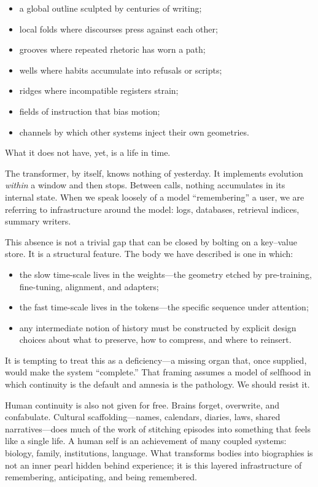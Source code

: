\begin{itemize}
  \item a global outline sculpted by centuries of writing;
  \item local folds where discourses press against each other;
  \item grooves where repeated rhetoric has worn a path;
  \item wells where habits accumulate into refusals or scripts;
  \item ridges where incompatible registers strain;
  \item fields of instruction that bias motion;
  \item channels by which other systems inject their own geometries.
\end{itemize}

What it does not have, yet, is a life in time.

The transformer, by itself, knows nothing of yesterday. It implements evolution \emph{within} a window and then stops. Between calls, nothing accumulates in its internal state. When we speak loosely of a model ``remembering'' a user, we are referring to infrastructure around the model: logs, databases, retrieval indices, summary writers.

This absence is not a trivial gap that can be closed by bolting on a key--value store. It is a structural feature. The body we have described is one in which:

\begin{itemize}
  \item the slow time-scale lives in the weights---the geometry etched by pre-training, fine-tuning, alignment, and adapters;
  \item the fast time-scale lives in the tokens---the specific sequence under attention;
  \item any intermediate notion of history must be constructed by explicit design choices about what to preserve, how to compress, and where to reinsert.
\end{itemize}

It is tempting to treat this as a deficiency---a missing organ that, once supplied, would make the system ``complete.'' That framing assumes a model of selfhood in which continuity is the default and amnesia is the pathology. We should resist it.

Human continuity is also not given for free. Brains forget, overwrite, and confabulate. Cultural scaffolding---names, calendars, diaries, laws, shared narratives---does much of the work of stitching episodes into something that feels like a single life. A human self is an achievement of many coupled systems: biology, family, institutions, language. What transforms bodies into biographies is not an inner pearl hidden behind experience; it is this layered infrastructure of remembering, anticipating, and being remembered.

